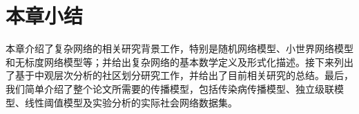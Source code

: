 \section{本章小结}
本章介绍了复杂网络的相关研究背景工作，特别是随机网络模型、小世界网络模型和无标度网络模型等；并给出复杂网络的基本数学定义及形式化描述。接下来列出了基于中观层次分析的社区划分研究工作，并给出了目前相关研究的总结。最后，我们简单介绍了整个论文所需要的传播模型，包括传染病传播模型、独立级联模型、线性阈值模型及实验分析的实际社会网络数据集。